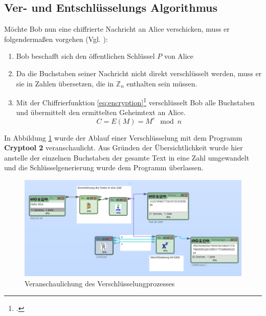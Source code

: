 \documentclass{scrarticle} %
\begin{document}
    \subsection{Ver- und Entschlüsselungs Algorithmus}
            Möchte Bob nun eine chiffrierte Nachricht an Alice verschicken, muss er folgendermaßen vorgehen (Vgl. \cite[71]{watjen2008}):
            \begin{enumerate}
                \item Bob beschafft sich den öffentlichen Schlüssel $P$ von Alice
                \item Da die Buchstaben seiner Nachricht nicht direkt verschlüsselt werden, muss er sie in Zahlen übersetzen, die in $\mathbb{Z}_n$ enthalten sein müssen. %
                \item
                Mit der Chiffrierfunktion \ref{eq:encryption}\footcite[77]{ertel2003} verschlüsselt Bob alle Buchstaben und übermittelt den ermittelten Geheimtext an Alice.
                \begin{equation}
                    C = E(M) = M^{e}\mod{n} \label{eq:encryption}
                \end{equation}
            \end{enumerate}
            In Abbildung \ref{fig:encrypt} wurde der Ablauf einer Verschlüsselung mit dem Programm \textbf{Cryptool 2} veranschaulicht. Aus Gründen der Übersichtlichkeit wurde hier anstelle der einzelnen Buchstaben der gesamte Text in eine Zahl umgewandelt und die Schlüsselgenerierung wurde dem Programm überlassen.
            \begin{figure}
                \includegraphics[width=\linewidth]{content/cryptool_encrypt_e1.png}
                \caption{Veranschaulichung des Verschlüsselungprozesses\protect\footnotemark}
                \label{fig:encrypt}
            \end{figure}
\end{document}

